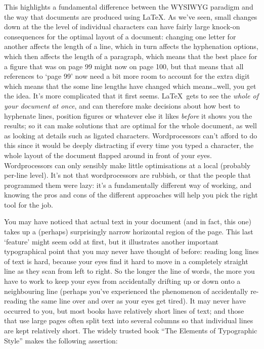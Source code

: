 \begin{refsection}
This highlights a fundamental difference between the WYSIWYG para\-digm and the way that documents are produced using \LaTeX. As we've seen, small changes down at the the level of individual characters can have fairly large knock-on consequences for the optimal layout of a document: changing one letter for another affects the length of a line, which in turn affects the hyphenation options, which then affects the length of a paragraph, which means that the best place for a figure that was on page 99 might now on page 100, but that means that all references to `page 99' now need a bit more room to account for the extra digit which means that the some line lengths have changed which means\ldots well, you get the idea. It's more complicated that it first seems. \LaTeX\ gets to see the \emph{whole of your document at once}, and can therefore make decisions about how best to hyphenate lines,  position figures or whatever else it likes \emph{before} it shows you the results; so it can make solutions that are optimal for the whole document, as well as looking at details such as ligated characters. Wordprocessors can't afford to do this since it would be deeply distracting if every time you typed a character, the whole layout of the document flapped around in front of your eyes. Wordprocessors can only sensibly make little optimisations at a local (probably per-line level). It's not that wordprocessors are rubbish, or that the people that programmed them were lazy: it's a fundamentally different way of working, and knowing the pros and cons of the different approaches will help you pick the right tool for the job. 

You may have noticed that actual text in your document (and in fact, this one) takes up a (perhaps) surprisingly narrow horizontal region of the page. This last `feature' might seem odd at first, but it illustrates another important typographical point that you may never have thought of before: reading long lines of text is hard, because your eyes find it hard to move in a completely straight line as they scan from left to right. So the longer the line of words, the more you have to work to keep your eyes from accidentally drifting up or down onto a neighbouring line (perhaps you've experienced the phenomenon of accidentally re-reading the same line over and over as your eyes get tired). It may never have occurred to you, but most books have relatively short lines of text; and those that use large pages often split text into several columns so that individual lines are kept relatively short. The widely trusted book ``The Elements of Typographic Style'' \citep{bringhurst92} makes the following assertion:


\end{refsection}
